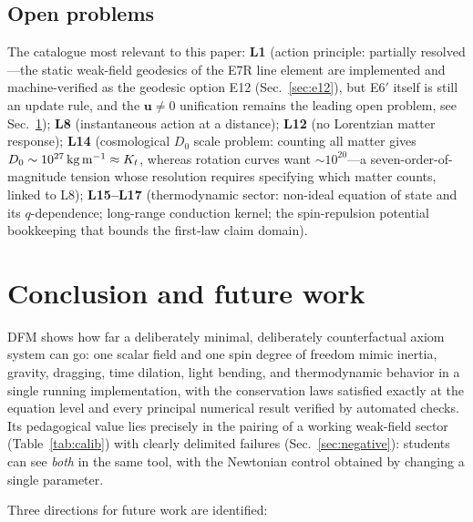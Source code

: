 \documentclass[aps,reprint,amsmath,amssymb,nofootinbib,superscriptaddress,floatfix]{revtex4-2}
\newcommand{\vect}[1]{\bm{#1}}
\newcommand{\Kt}{K_t}
\newcommand{\Dz}{D_0}
\begin{document}
\subsection{Open problems}
\label{sec:limits}

The catalogue most relevant to this paper:
{\bf L1} (action principle: partially resolved---the static
weak-field geodesics of the E7R line element are implemented and
machine-verified as the geodesic option E12 (Sec.~\ref{sec:e12}),
but E6$'$ itself is still an update rule, and the $\vect{u}\ne0$
unification remains the leading open problem, see
Sec.~\ref{sec:conclusion});
{\bf L8} (instantaneous action at a distance);
{\bf L12} (no Lorentzian matter response);
{\bf L14} (cosmological $\Dz$ scale problem: counting all matter gives
$\Dz \sim 10^{27}\,{\rm kg\,m^{-1}} \approx \Kt$, whereas rotation
curves want $\sim10^{20}$---a seven-order-of-magnitude tension whose
resolution requires specifying which matter counts, linked to L8);
{\bf L15--L17} (thermodynamic sector: non-ideal equation of state and
its $q$-dependence; long-range conduction kernel; the spin-repulsion
potential bookkeeping that bounds the first-law claim domain).

\section{Conclusion and future work}
\label{sec:conclusion}

DFM shows how far a deliberately minimal, deliberately counterfactual
axiom system can go: one scalar field and one spin degree of freedom
mimic inertia, gravity, dragging, time dilation, light bending, and
thermodynamic behavior in a single running implementation, with the
conservation laws satisfied exactly at the equation level and every
principal numerical result verified by automated checks.
Its pedagogical value lies precisely in the pairing of a working
weak-field sector (Table~\ref{tab:calib}) with clearly delimited
failures (Sec.~\ref{sec:negative}): students can see \emph{both} in
the same tool, with the Newtonian control obtained by changing a
single parameter.

Three directions for future work are identified:
\end{document}
